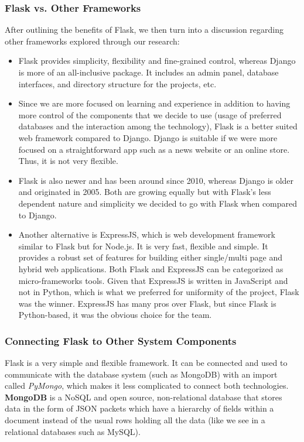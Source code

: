 \documentclass[titlepage, 12pt]{article}
\begin{document}
\subsubsection{Flask vs. Other Frameworks}

After outlining the benefits of Flask, we then turn into a discussion regarding other frameworks explored through our research:

\begin{itemize}
    \item Flask provides simplicity, flexibility and fine-grained control, whereas Django is more of an all-inclusive package. It includes an admin panel, database interfaces, and directory structure for the projects, etc.
    \item Since we are more focused on learning and experience in addition to having more control of the components that we decide to use (usage of preferred databases and the interaction among the technology), Flask is a better suited web framework compared to Django. Django is suitable if we were more focused on a straightforward app such as a news website or an online store. Thus, it is not very flexible.
    \item Flask is also newer and has been around since 2010, whereas Django is older and originated in 2005. Both are growing equally but with Flask’s less dependent nature and simplicity we decided to go with Flask when compared to Django.
    \item Another alternative is ExpressJS, which is web development framework similar to Flask but for Node.js. It is very fast, flexible and simple. It provides a robust set of features for building either single/multi page and hybrid web applications. Both Flask and ExpressJS can be categorized as micro-frameworks tools. Given that ExpressJS is written in JavaScript and not in Python, which is what we preferred for uniformity of the project, Flask was the winner. ExpressJS has many pros over Flask, but since Flask is Python-based, it was the obvious choice for the team.

\end{itemize}

\subsubsection{Connecting Flask to Other System Components}

Flask is a very simple and flexible framework. It can be connected and used to communicate with the database system (such as MongoDB) with an import called  \emph{PyMongo}, which makes it less complicated to connect both technologies. \textbf{MongoDB} is a NoSQL and open source, non-relational database that stores data in the form of JSON packets which have a hierarchy of fields within a document instead of the usual rows holding all the data (like we see in a relational databases such as MySQL).
\end{document}
